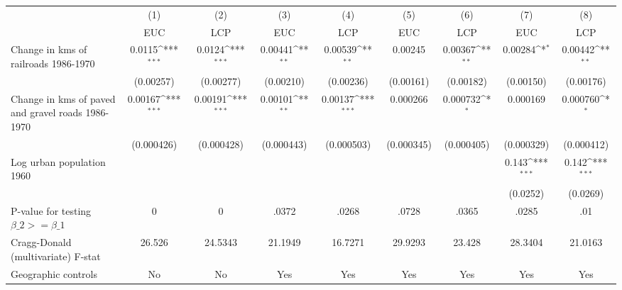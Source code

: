 {
\def\sym#1{\ifmmode^{#1}\else\(^{#1}\)\fi}
\begin{tabular}{l*{8}{c}}
\hline\hline
                &\multicolumn{1}{c}{(1)}&\multicolumn{1}{c}{(2)}&\multicolumn{1}{c}{(3)}&\multicolumn{1}{c}{(4)}&\multicolumn{1}{c}{(5)}&\multicolumn{1}{c}{(6)}&\multicolumn{1}{c}{(7)}&\multicolumn{1}{c}{(8)}\\
                &\multicolumn{1}{c}{EUC}&\multicolumn{1}{c}{LCP}&\multicolumn{1}{c}{EUC}&\multicolumn{1}{c}{LCP}&\multicolumn{1}{c}{EUC}&\multicolumn{1}{c}{LCP}&\multicolumn{1}{c}{EUC}&\multicolumn{1}{c}{LCP}\\
\hline
Change in kms of railroads 1986-1970&   0.0115\sym{***}&   0.0124\sym{***}&  0.00441\sym{**} &  0.00539\sym{**} &  0.00245         &  0.00367\sym{**} &  0.00284\sym{*}  &  0.00442\sym{**} \\
                &(0.00257)         &(0.00277)         &(0.00210)         &(0.00236)         &(0.00161)         &(0.00182)         &(0.00150)         &(0.00176)         \\
[1em]
Change in kms of paved and gravel roads 1986-1970&  0.00167\sym{***}&  0.00191\sym{***}&  0.00101\sym{**} &  0.00137\sym{***}& 0.000266         & 0.000732\sym{*}  & 0.000169         & 0.000760\sym{*}  \\
                &(0.000426)         &(0.000428)         &(0.000443)         &(0.000503)         &(0.000345)         &(0.000405)         &(0.000329)         &(0.000412)         \\
[1em]
Log urban population 1960&                  &                  &                  &                  &                  &                  &    0.143\sym{***}&    0.142\sym{***}\\
                &                  &                  &                  &                  &                  &                  & (0.0252)         & (0.0269)         \\
\hline
P-value for testing $\beta\_{2} >= \beta\_{1}$&        0         &        0         &    .0372         &    .0268         &    .0728         &    .0365         &    .0285         &      .01         \\
Cragg-Donald (multivariate) F-stat&   26.526         &  24.5343         &  21.1949         &  16.7271         &  29.9293         &   23.428         &  28.3404         &  21.0163         \\
Geographic controls&       No         &       No         &      Yes         &      Yes         &      Yes         &      Yes         &      Yes         &      Yes         \\

\end{tabular}}
